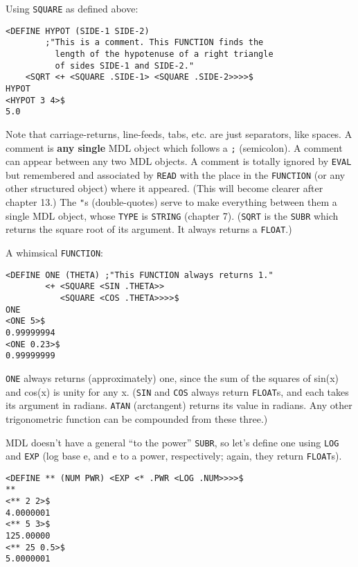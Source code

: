 \documentclass[a4paper,]{article}
\begin{document}
Using \texttt{SQUARE} as defined above:

\begin{verbatim}
<DEFINE HYPOT (SIDE-1 SIDE-2)
        ;"This is a comment. This FUNCTION finds the
          length of the hypotenuse of a right triangle
          of sides SIDE-1 and SIDE-2."
    <SQRT <+ <SQUARE .SIDE-1> <SQUARE .SIDE-2>>>>$
HYPOT
<HYPOT 3 4>$
5.0
\end{verbatim}

Note that carriage-returns, line-feeds, tabs, etc. are just separators, like spaces. A comment is \textbf{any single} MDL
object which follows a \texttt{;}  (semicolon). A comment can appear between any two MDL objects.
A comment is totally ignored by \texttt{EVAL} but remembered and associated by \texttt{READ} with the place in the
\texttt{FUNCTION} (or any other structured object) where it appeared. (This will become clearer after chapter 13.) The
\texttt{"}s (double-quotes) serve to make everything between them a single MDL object, whose \texttt{TYPE} is
\texttt{STRING} (chapter 7). (\texttt{SQRT} is the \texttt{SUBR} which returns the square root
of its argument. It always returns a \texttt{FLOAT}.)

A whimsical \texttt{FUNCTION}:

\begin{verbatim}
<DEFINE ONE (THETA) ;"This FUNCTION always returns 1."
        <+ <SQUARE <SIN .THETA>>
           <SQUARE <COS .THETA>>>>$
ONE
<ONE 5>$
0.99999994
<ONE 0.23>$
0.99999999
\end{verbatim}

\texttt{ONE} always returns (approximately) one, since the sum of the squares of sin(x) and cos(x) is unity for any x.
(\texttt{SIN}  and \texttt{COS} always return \texttt{FLOAT}s, and
each takes its argument in radians. \texttt{ATAN} (arctangent) returns its value in radians.
Any other trigonometric function can be compounded from these three.)

MDL doesn't have a general ``to the power'' \texttt{SUBR}, so let's define one using \texttt{LOG}
 and \texttt{EXP}  (log base e, and e to a power, respectively;
again, they return \texttt{FLOAT}s).

\begin{verbatim}
<DEFINE ** (NUM PWR) <EXP <* .PWR <LOG .NUM>>>>$
**
<** 2 2>$
4.0000001
<** 5 3>$
125.00000
<** 25 0.5>$
5.0000001
\end{verbatim}
\end{document}
